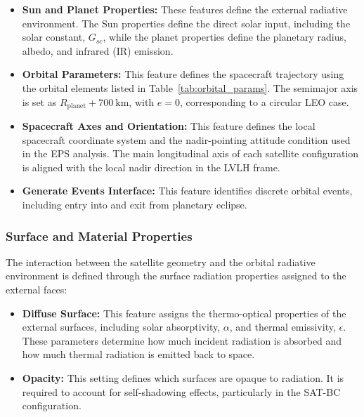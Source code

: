 \begin{itemize}
    \item \textbf{Sun and Planet Properties:} These features define the external radiative environment. The Sun properties define the direct solar input, including the solar constant, \(G_{sc}\), while the planet properties define the planetary radius, albedo, and infrared (IR) emission.

    \item \textbf{Orbital Parameters:} This feature defines the spacecraft trajectory using the orbital elements listed in Table~\ref{tab:orbital_params}. The semimajor axis is set as \(R_{\mathrm{planet}} + 700~\mathrm{km}\), with \(e=0\), corresponding to a circular LEO case.

    \item \textbf{Spacecraft Axes and Orientation:} This feature defines the local spacecraft coordinate system and the nadir-pointing attitude condition used in the EPS analysis. The main longitudinal axis of each satellite configuration is aligned with the local nadir direction in the LVLH frame.

    \item \textbf{Generate Events Interface:} This feature identifies discrete orbital events, including entry into and exit from planetary eclipse.
\end{itemize}

\subsubsection{Surface and Material Properties}
\label{subsub:eps_surface_material_properties}

The interaction between the satellite geometry and the orbital radiative environment is defined through the surface radiation properties assigned to the external faces:

\begin{itemize}
    \item \textbf{Diffuse Surface:} This feature assigns the thermo-optical properties of the external surfaces, including solar absorptivity, \(\alpha\), and thermal emissivity, \(\epsilon\). These parameters determine how much incident radiation is absorbed and how much thermal radiation is emitted back to space.

    \item \textbf{Opacity:} This setting defines which surfaces are opaque to radiation. It is required to account for self-shadowing effects, particularly in the SAT-BC configuration.
\end{itemize}

